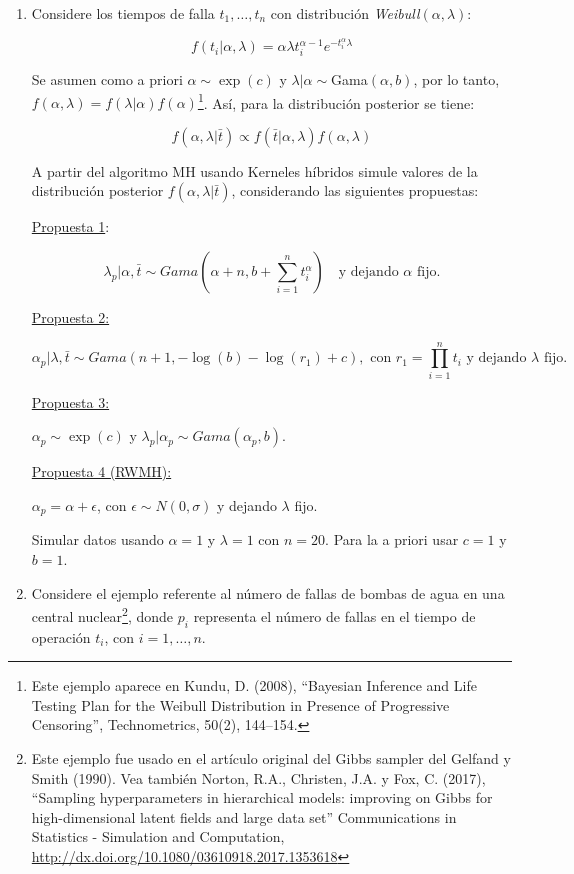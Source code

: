 \documentclass{article}
\begin{document}
\begin{enumerate}
    \item Considere los tiempos de falla $t_1, \dots, t_n$ con distribución 
    \textit{Weibull}$(\alpha, \lambda)$:
    
    \[ f (t_i|\alpha, \lambda) = \alpha\lambda t^{\alpha-1}_i e^{-t^\alpha_i 
    \lambda} \]
    
    Se asumen como a priori $\alpha \sim \exp(c)$ y $\lambda|\alpha \sim 
    $Gama$(\alpha, b)$, por lo tanto, $f (\alpha, \lambda) = f (\lambda|\alpha) 
    f (\alpha)$\footnote{Este ejemplo aparece en Kundu, D. (2008), ``Bayesian 
    Inference and Life Testing Plan for the Weibull Distribution in Presence of 
    Progressive Censoring'', Technometrics, 50(2), 144–154.}. Así, para la 
    distribución posterior se tiene:
    
    \[f (\alpha, \lambda|\bar t) \propto f (\bar t|\alpha, \lambda)f (\alpha, 
    \lambda)\]
    
    A partir del algoritmo MH usando Kerneles híbridos simule valores de la distribución 
    posterior $f(\alpha, \lambda|\bar t)$, considerando las siguientes propuestas:


    \underline{Propuesta 1}:

    \[ \lambda_p|\alpha, \bar t \sim Gama \left(\alpha + n , b +\sum_{i=1}^n 
    t^\alpha_i \right) \quad \text{y dejando $\alpha$ fijo.} \]

    \underline{Propuesta 2:}

    \[\alpha_p|\lambda, \bar t \sim Gama (n + 1 , -\log(b) - \log(r_1) + c), 
    \text{ con } r_1 = \prod_{i=1}^n t_i \text{ y dejando $\lambda$ fijo. }\]
    
    \underline{Propuesta 3:}
    
    $\alpha_p \sim \exp(c)$ y $\lambda_p|\alpha_p \sim Gama(\alpha_p, b)$.

    \underline{Propuesta 4 (RWMH):} 
    
    $\alpha_p = \alpha + \epsilon$, con $\epsilon \sim N (0, \sigma)$ y dejando 
    $\lambda$ fijo. 
    
    Simular datos usando $\alpha = 1$ y $\lambda = 1$ con $n = 20$. 
    Para la a priori usar $c = 1$ y $b = 1$.



    \item Considere el ejemplo referente al número de fallas de bombas de agua en 
    una central nuclear\footnote{Este ejemplo fue usado en el artículo original 
    del Gibbs sampler del Gelfand y Smith (1990). Vea también Norton, R.A., 
    Christen, J.A. y Fox, C. (2017), ``Sampling hyperparameters in hierarchical 
    models: improving on Gibbs for high-dimensional latent fields and large data 
    set'' Communications in Statistics - Simulation and Computation, 
    \url{http://dx.doi.org/10.1080/03610918.2017.1353618} }, donde $p_i$ 
    representa el número de fallas en el tiempo de operación $t_i$, con $i = 1, 
    \dots, n$.


\end{enumerate}
\end{document}
